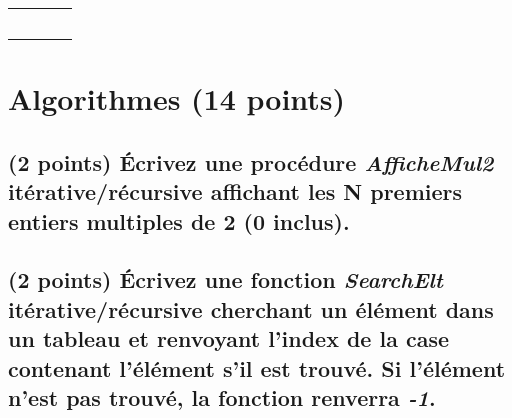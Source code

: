 \documentclass[11pt,a4paper]{article}
\begin{document}
\begin{table}[h!]
\begin{minipage}{0.4\textwidth}
\begin{tabular}{| C{1cm} | C{1cm} | C{1cm} | C{1cm} |}
             &     &     &       \\
             &     &     &       \\
        \hline
             &     &     &       \\
             &     &     &       \\
             &     &     &       \\
        \hline
    \end{tabular}
  \end{minipage}
\end{table}


\vfillLast
\newpage

\section{Algorithmes (14 points)}

\subsection{(2 points) \'Ecrivez une procédure \og \textit{AfficheMul2} \fg{} itérative/récursive affichant les N premiers entiers multiples de 2 (0 inclus). }

\bigskip

\begin{center}
\end{center}

\smallskip



\newpage

\vfillFirst

\subsection{(2 points) \'Ecrivez une fonction \og \textit{SearchElt} \fg{} itérative/récursive cherchant un élément dans un tableau et renvoyant l'index de la case contenant l'élément s'il est trouvé. Si l'élément n'est pas trouvé, la fonction renverra \textit{-1}. }

\bigskip

\begin{center}
\end{center}
\end{document}
